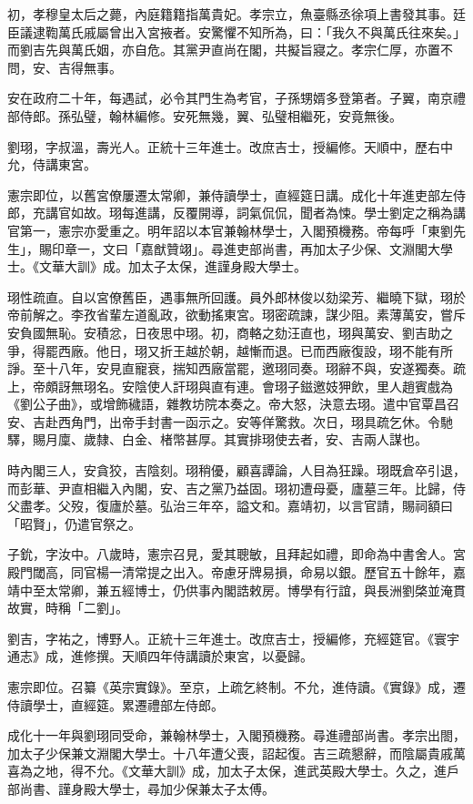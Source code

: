 \begin{pinyinscope}
初，孝穆皇太后之薨，內庭籍籍指萬貴妃。孝宗立，魚臺縣丞徐項上書發其事。廷臣議逮鞫萬氏戚屬曾出入宮掖者。安驚懼不知所為，曰：「我久不與萬氏往來矣。」而劉吉先與萬氏姻，亦自危。其黨尹直尚在閣，共擬旨寢之。孝宗仁厚，亦置不問，安、吉得無事。

安在政府二十年，每遇試，必令其門生為考官，子孫甥婿多登第者。子翼，南京禮部侍郎。孫弘璧，翰林編修。安死無幾，翼、弘璧相繼死，安竟無後。

劉珝，字叔溫，壽光人。正統十三年進士。改庶吉士，授編修。天順中，歷右中允，侍講東宮。

憲宗即位，以舊宮僚屢遷太常卿，兼侍讀學士，直經筵日講。成化十年進吏部左侍郎，充講官如故。珝每進講，反覆開導，詞氣侃侃，聞者為悚。學士劉定之稱為講官第一，憲宗亦愛重之。明年詔以本官兼翰林學士，入閣預機務。帝每呼「東劉先生」，賜印章一，文曰「嘉猷贊翊」。尋進吏部尚書，再加太子少保、文淵閣大學士。《文華大訓》成。加太子太保，進謹身殿大學士。

珝性疏直。自以宮僚舊臣，遇事無所回護。員外郎林俊以劾梁芳、繼曉下獄，珝於帝前解之。李孜省輩左道亂政，欲動搖東宮。珝密疏諫，謀少阻。素薄萬安，嘗斥安負國無恥。安積忿，日夜思中珝。初，商輅之劾汪直也，珝與萬安、劉吉助之爭，得罷西廠。他日，珝又折王越於朝，越慚而退。已而西廠復設，珝不能有所諍。至十八年，安見直寵衰，揣知西廠當罷，邀珝同奏。珝辭不與，安遂獨奏。疏上，帝頗訝無珝名。安陰使人訐珝與直有連。會珝子鎡邀妓狎飲，里人趙賓戲為《劉公子曲》，或增飾穢語，雜教坊院本奏之。帝大怒，決意去珝。遣中官覃昌召安、吉赴西角門，出帝手封書一函示之。安等佯驚救。次日，珝具疏乞休。令馳驛，賜月廩、歲隸、白金、楮幣甚厚。其實排珝使去者，安、吉兩人謀也。

時內閣三人，安貪狡，吉陰刻。珝稍優，顧喜譚論，人目為狂躁。珝既倉卒引退，而彭華、尹直相繼入內閣，安、吉之黨乃益固。珝初遭母憂，廬墓三年。比歸，侍父盡孝。父歿，復廬於墓。弘治三年卒，謚文和。嘉靖初，以言官請，賜祠額曰「昭賢」，仍遣官祭之。

子鈗，字汝中。八歲時，憲宗召見，愛其聰敏，且拜起如禮，即命為中書舍人。宮殿門閾高，同官楊一清常提之出入。帝慮牙牌易損，命易以銀。歷官五十餘年，嘉靖中至太常卿，兼五經博士，仍供事內閣誥敕房。博學有行誼，與長洲劉棨並淹貫故實，時稱「二劉」。

劉吉，字祐之，博野人。正統十三年進士。改庶吉士，授編修，充經筵官。《寰宇通志》成，進修撰。天順四年侍講讀於東宮，以憂歸。

憲宗即位。召纂《英宗實錄》。至京，上疏乞終制。不允，進侍讀。《實錄》成，遷侍讀學士，直經筵。累遷禮部左侍郎。

成化十一年與劉珝同受命，兼翰林學士，入閣預機務。尋進禮部尚書。孝宗出閤，加太子少保兼文淵閣大學士。十八年遭父喪，詔起復。吉三疏懇辭，而陰屬貴戚萬喜為之地，得不允。《文華大訓》成，加太子太保，進武英殿大學士。久之，進戶部尚書、謹身殿大學士，尋加少保兼太子太傅。


\end{pinyinscope}
